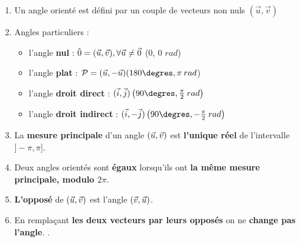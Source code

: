 \begin{multicols}{2}

\begin{enumerate}
\item Un angle orienté est défini par un couple de vecteurs non nuls $(\vec{u}, \vec{v})$

\item Angles particuliers :
\begin{itemize}
	\item l'angle \textbf{nul} : $\hat{0} = (\vec{u}, \vec{v}) , \forall \vec{u} \neq \vec{0} $  (0\degres, 0 $rad$)
	\item l'angle \textbf{plat} :  $\mathcal{P} = \aopn{u}{u} (180\degres, \pi \:rad $)
	\item l'angle \textbf{droit direct} : $\aopp{i}{j} \left(90\degres, \frac{\pi}{2} \: rad\right)$
	\item l'angle \textbf{droit indirect} : $\aopn{i}{j} \left(90\degres, -\frac{\pi}{2} \: rad\right)$
\end{itemize}

\item La \textbf{mesure principale} d'un angle $(\vec{u}, \vec{v})$ est \textbf{l'unique réel} de l'intervalle $]-\pi, \pi]$.

\item Deux angles orientés sont \textbf{égaux} lorsqu'ils ont \textbf{la même mesure principale, modulo $2\pi$}.

\item \textbf{L'opposé} de $(\vec{u}, \vec{v})$ est l'angle $(\vec{v}, \vec{u})$. %

\item En remplaçant \textbf{les deux vecteurs par leurs opposés} on ne \textbf{change pas l'angle}. %
.
\end{enumerate}
\end{multicols}